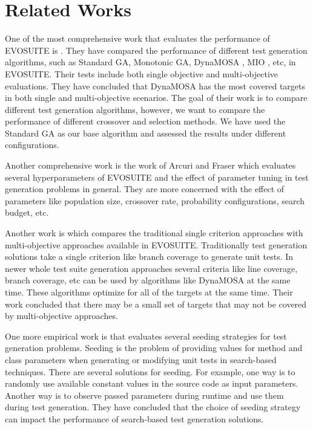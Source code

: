 \documentclass[sigconf]{acmart}
\begin{document}
\section{Related Works}
\label{relatedworks}
One of the most comprehensive work that evaluates the performance of EVOSUITE is \cite{CAMPOS2018207}. They have
compared the performance of different test generation algorithms, such as Standard GA, Monotonic GA, 
DynaMOSA \cite{7840029}, MIO \cite{Arcuri_2017}, etc, in EVOSUITE. 
Their tests include both single objective and multi-objective evaluations. They have concluded that
DynaMOSA has the most covered targets in both single and multi-objective scenarios. The goal of their work is
to compare different test generation algorithms, however, we want to compare the performance of different crossover
and selection methods. We have used the Standard GA as our base algorithm and assessed the results under different
configurations.

Another comprehensive work is the work of Arcuri and Fraser \cite{Tuning13} which evaluates several 
hyperparameters of EVOSUITE and the effect of parameter tuning in test generation problems in general.
They are more concerned with the effect of parameters like population size, crossover rate, probability
configurations, search budget, etc. 

Another work is \cite{emse16_effectiveness} which compares the traditional single criterion approaches
with multi-objective approaches available in EVOSUITE. Traditionally test generation solutions take
a single criterion like branch coverage to generate unit tests. In newer whole test suite generation 
approaches several criteria like line coverage, branch coverage, etc can be used by algorithms 
like DynaMOSA \cite{7840029} at the same time. 
These algorithms optimize for all of the targets at the same time. Their work concluded
that there may be a small set of targets that may not be covered by multi-objective approaches.

One more empirical work is \cite{STVR_seeding} that evaluates several seeding strategies for test generation
problems. Seeding is the problem of providing values for method and class parameters when generating or
modifying unit tests in search-based techniques. There are several solutions for seeding. For example, 
one way is to randomly use available constant values in the source code as input parameters.
Another way is to observe passed parameters during runtime and use them during test generation. They have concluded 
that the choice of seeding strategy can impact the performance of search-based test generation solutions.
\end{document}
